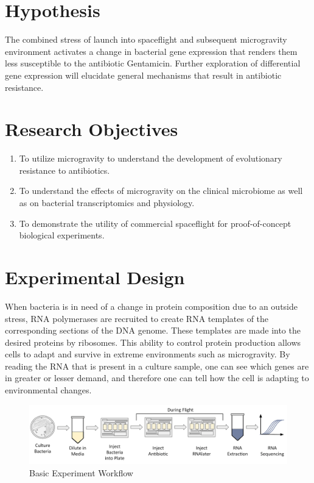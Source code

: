 \documentclass[twocolumn]{article}
\begin{document}
\section{Hypothesis}
The combined stress of launch into spaceflight and subsequent microgravity environment activates a change in bacterial gene expression that renders them less susceptible to the antibiotic Gentamicin. Further exploration of differential gene expression will elucidate general mechanisms that result in antibiotic resistance. 

\section{Research Objectives}
\begin{enumerate}
    \item To utilize microgravity to understand the development of evolutionary resistance to antibiotics.
    \item To understand the effects of microgravity on the clinical microbiome as well as on bacterial transcriptomics and physiology.
    \item To demonstrate the utility of commercial spaceflight for proof-of-concept biological experiments.
\end{enumerate}

\section{Experimental Design}

When bacteria is in need of a change in protein composition due to an outside stress, RNA polymerases are recruited to create RNA templates of the corresponding sections of the DNA genome. These templates are made into the desired proteins by ribosomes. This ability to control protein production allows cells to adapt and survive in extreme environments such as microgravity. By reading the RNA that is present in a culture sample, one can see which genes are in greater or lesser demand, and therefore one can tell how the cell is adapting to environmental changes.

\begin{figure}[h]
    \centering
    \includegraphics[scale = 0.22]{images/sequence1.png}
    \caption{Basic Experiment Workflow}
    \label{fig:my_label}
\end{figure}
\end{document}
